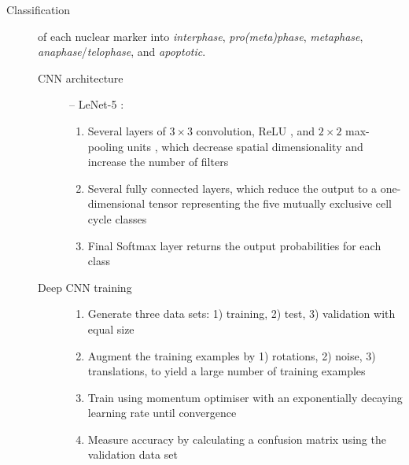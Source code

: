 \begin{description}
    \item[Classification] of each nuclear marker into \textit{interphase}, \textit{pro(meta)phase}, \textit{metaphase}, \textit{anaphase}/\textit{telophase}, and \textit{apoptotic}.
    \begin{description}
        \item[CNN architecture] -- LeNet-5 \cite{lecun1998gradient,lecun2015lenet}: 
        \begin{enumerate}
            \item Several layers of $3\times3$ convolution, ReLU \cite{nair2010rectified}, and $2\times2$ max-pooling units \cite{scherer2010evaluation}, which decrease spatial dimensionality and increase the number of filters
            \item Several fully connected layers, which reduce the output to a one-dimensional tensor representing the five mutually exclusive cell cycle classes
            \item Final Softmax layer returns the output probabilities for each class
        \end{enumerate}
        \item[Deep CNN training] \mbox{}
        \begin{enumerate}
            \item Generate three data sets: 1) training, 2) test, 3) validation with equal size
            \item Augment the training examples by 1) rotations, 2) noise, 3) translations, to yield a large number of training examples
            \item Train using momentum optimiser with an exponentially decaying learning rate until convergence
            \item Measure accuracy by calculating a confusion matrix using the validation data set
        \end{enumerate}
    \end{description}
    

\end{description}
